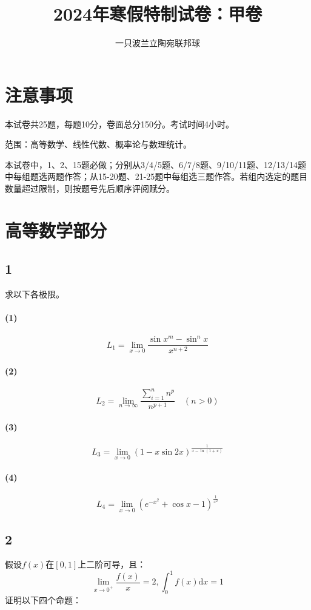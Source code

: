 \documentclass[a4paper,12pt]{article}
\title{2024年寒假特制试卷：甲卷}
\author{一只波兰立陶宛联邦球}
\date{}
\begin{document}
\maketitle
\section*{注意事项}
本试卷共25题，每题10分，卷面总分150分。考试时间4小时。

范围：高等数学、线性代数、概率论与数理统计。

本试卷中，1、2、15题必做；分别从3/4/5题、6/7/8题、9/10/11题、12/13/14题中每组题选两题作答；从15-20题、21-25题中每组选三题作答。若组内选定的题目数量超过限制，则按题号先后顺序评阅赋分。
\section*{高等数学部分}
\subsection*{1}求以下各极限。
\paragraph{(1)}
\begin{equation*}
	L_{1}=\lim\limits_{x\rightarrow 0}\frac{\sin x^{m}-\sin^{n}x}{x^{n+2}}
\end{equation*}
\paragraph{(2)}
\begin{equation*}
	L_{2}=\lim\limits_{n\rightarrow\infty}\frac{\sum_{i=1}^{n}n^{p}}{n^{p+1}}\quad (n>0)
\end{equation*}
\paragraph{(3)}
\begin{equation*}
	L_{3}=\lim\limits_{x\rightarrow 0}(1-x\sin 2x)^{\frac{1}{x-\ln(1+x)}}
\end{equation*}
\paragraph{(4)}\begin{equation*}
	L_{4}=\lim\limits_{x\rightarrow 0}(e^{-x^2}+\cos x-1)^{\frac{1}{x^2}}
\end{equation*}
\subsection*{2}
假设$f(x)$在$\left[0,1\right]$上二阶可导，且：
\begin{equation*}
	\lim\limits_{x\rightarrow 0^{+}}\frac{f(x)}{x}=2,\int_{0}^{1}f(x)\mathrm{d}x = 1
\end{equation*}
证明以下四个命题：
\end{document}
